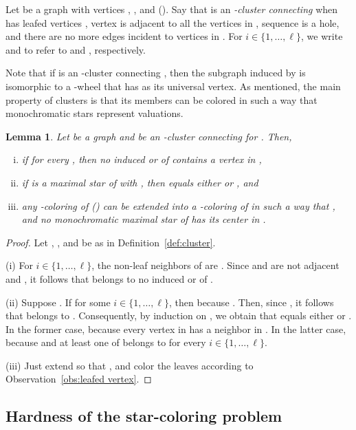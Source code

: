 \documentclass[a4paper, 11pt, oneside]{article}
\newtheorem{lemma}[theorem]{Lemma}
\newcommand{\range}[3]{\ensuremath{#1 \in \{#2,\ldots,#3\}}}
\let\Definition=\emph
\begin{document}
\begin{defn}[-cluster]\label{def:cluster}
  Let  be a graph with vertices , , and  ().  Say that  is an \Definition{-cluster connecting } when  has  leafed vertices , vertex  is adjacent to all the vertices in , sequence  is a hole, and there are no more edges incident to vertices in .  For \range{i}{1}{\ell}, we write  and  to refer to  and , respectively.  
\end{defn}

Note that if  is an -cluster connecting , then the subgraph induced by  is isomorphic to a -wheel that has  as its universal vertex.  As mentioned, the main property of clusters is that its members can be colored in such a way that monochromatic stars represent valuations.

\begin{lemma}\label{lem:cluster properties}
 Let  be a graph and  be an -cluster connecting  for .  Then, 
 \begin{enumerate}[(i)]
  \item if  for every , then no induced  or  of  contains a vertex in ,
  \item if  is a maximal star of  with , then  equals either  or , and \label{lem:cluster properties:stars}
  \item any -coloring  of  () can be extended into a -coloring of  in such a way that , and no monochromatic maximal star of  has its center in . \label{lem:cluster properties:extension}
 \end{enumerate}
\end{lemma}

\begin{proof}
  Let , , and  be as in Definition~\ref{def:cluster}.
  
  (i) For \range{i}{1}{\ell}, the non-leaf neighbors of  are .  Since  and  are not adjacent and , it follows that  belongs to no induced  or  of .  
  
  (ii) Suppose .  If  for some \range{i}{1}{\ell}, then  because .  Then, since , it follows that  belongs to .  Consequently, by induction on , we obtain that  equals either  or .  In the former case,  because every vertex in  has a neighbor in .  In the latter case,  because  and at least one of  belongs to  for every \range{i}{1}{\ell}.
  
  (iii)  Just extend  so that , and color the leaves according to Observation~\ref{obs:leafed vertex}.
\end{proof}

\subsection{Hardness of the star-coloring problem}
\label{sec:general case:2-stp}
\end{document}
